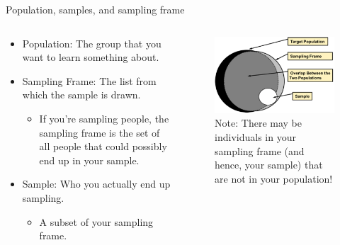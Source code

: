\documentclass[aspectratio=169]{../latex_main/tntbeamer}  %
\begin{document}
	
		\begin{frame}{Population, samples, and sampling frame}
	    \begin{columns}
	        \begin{column}{.4\textwidth}
         
	            \begin{itemize}
	                \item Population: The group that you want to learn something about.
                    \item Sampling Frame: The list from which the sample is drawn.
                    \begin{itemize}
                        \item If you’re sampling people, the sampling frame is the set of all people that could possibly end up in your sample.
                    \end{itemize}
                    \item Sample: Who you actually end up sampling. 
                    \begin{itemize}
                        \item A subset of your sampling frame.
                    \end{itemize}
	            \end{itemize}
	        \end{column}
	        
	        \begin{column}{.4\textwidth}

                \vspace*{-2em}
                \begin{figure}
                    \centering
                    \includegraphics[scale=.7]{Bild13}\\
                    Note: There may be individuals in your sampling frame (and hence, your sample) that are not in your population!

                \end{figure}
	        \end{column}
	        
	    \end{columns}
	    
	\end{frame}
	
\end{document}

